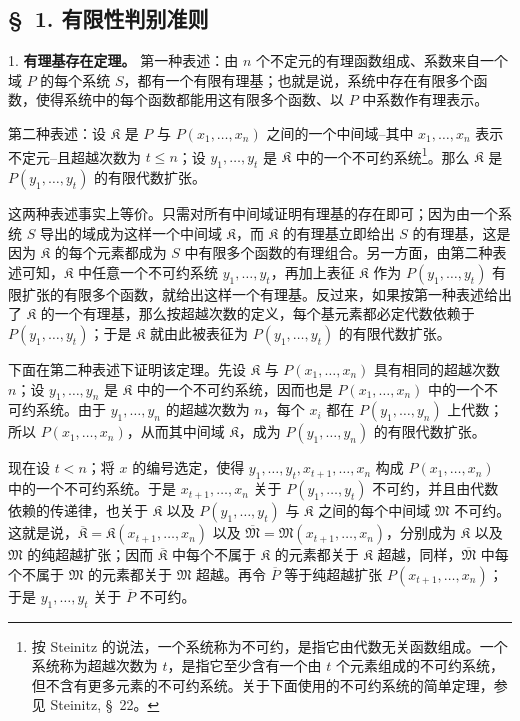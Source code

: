 \subsection*{\S\ 1. 有限性判别准则}

1. \textbf{有理基存在定理。} 第一种表述：由 $n$ 个不定元的有理函数组成、系数来自一个域 $P$ 的每个系统 $S$，都有一个有限有理基；也就是说，系统中存在有限多个函数，使得系统中的每个函数都能用这有限多个函数、以 $P$ 中系数作有理表示。

第二种表述：设 $\mathfrak K$ 是 $P$ 与 $P(x_1,\ldots,x_n)$ 之间的一个中间域--其中 $x_1,\ldots,x_n$ 表示不定元--且超越次数为 $t\leq n$；设 $y_1,\ldots,y_t$ 是 $\mathfrak K$ 中的一个不可约系统\footnote{按 Steinitz 的说法，一个系统称为不可约，是指它由代数无关函数组成。一个系统称为超越次数为 $t$，是指它至少含有一个由 $t$ 个元素组成的不可约系统，但不含有更多元素的不可约系统。关于下面使用的不可约系统的简单定理，参见 Steinitz, \S\ 22。}。那么 $\mathfrak K$ 是 $P(y_1,\ldots,y_t)$ 的有限代数扩张。

这两种表述事实上等价。只需对所有中间域证明有理基的存在即可；因为由一个系统 $S$ 导出的域成为这样一个中间域 $\mathfrak K$，而 $\mathfrak K$ 的有理基立即给出 $S$ 的有理基，这是因为 $\mathfrak K$ 的每个元素都成为 $S$ 中有限多个函数的有理组合。另一方面，由第二种表述可知，$\mathfrak K$ 中任意一个不可约系统 $y_1,\ldots,y_t$，再加上表征 $\mathfrak K$ 作为 $P(y_1,\ldots,y_t)$ 有限扩张的有限多个函数，就给出这样一个有理基。反过来，如果按第一种表述给出了 $\mathfrak K$ 的一个有理基，那么按超越次数的定义，每个基元素都必定代数依赖于 $P(y_1,\ldots,y_t)$；于是 $\mathfrak K$ 就由此被表征为 $P(y_1,\ldots,y_t)$ 的有限代数扩张。

下面在第二种表述下证明该定理。先设 $\mathfrak K$ 与 $P(x_1,\ldots,x_n)$ 具有相同的超越次数 $n$；设 $y_1,\ldots,y_n$ 是 $\mathfrak K$ 中的一个不可约系统，因而也是 $P(x_1,\ldots,x_n)$ 中的一个不可约系统。由于 $y_1,\ldots,y_n$ 的超越次数为 $n$，每个 $x_i$ 都在 $P(y_1,\ldots,y_n)$ 上代数；所以 $P(x_1,\ldots,x_n)$，从而其中间域 $\mathfrak K$，成为 $P(y_1,\ldots,y_n)$ 的有限代数扩张。

现在设 $t<n$；将 $x$ 的编号选定，使得 $y_1,\ldots,y_t,x_{t+1},\ldots,x_n$ 构成 $P(x_1,\ldots,x_n)$ 中的一个不可约系统。于是 $x_{t+1},\ldots,x_n$ 关于 $P(y_1,\ldots,y_t)$ 不可约，并且由代数依赖的传递律，也关于 $\mathfrak K$ 以及 $P(y_1,\ldots,y_t)$ 与 $\mathfrak K$ 之间的每个中间域 $\mathfrak M$ 不可约。这就是说，$\overline{\mathfrak K}=\mathfrak K(x_{t+1},\ldots,x_n)$ 以及 $\overline{\mathfrak M}=\mathfrak M(x_{t+1},\ldots,x_n)$，分别成为 $\mathfrak K$ 以及 $\mathfrak M$ 的纯超越扩张；因而 $\overline{\mathfrak K}$ 中每个不属于 $\mathfrak K$ 的元素都关于 $\mathfrak K$ 超越，同样，$\overline{\mathfrak M}$ 中每个不属于 $\mathfrak M$ 的元素都关于 $\mathfrak M$ 超越。再令 $\overline P$ 等于纯超越扩张 $P(x_{t+1},\ldots,x_n)$；于是 $y_1,\ldots,y_t$ 关于 $\overline P$ 不可约。

